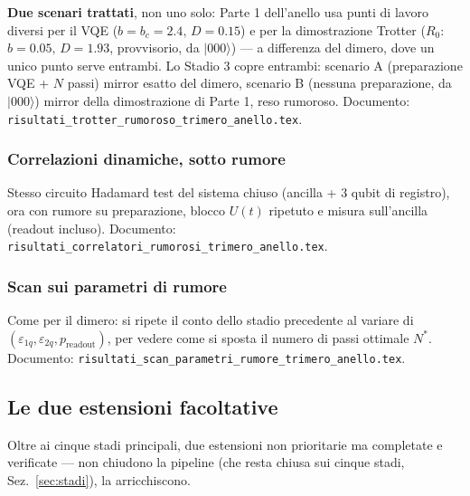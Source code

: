 \documentclass[11pt,a4paper]{article}
\newcommand{\ket}[1]{\lvert #1 \rangle}
\begin{document}
\textbf{Due scenari trattati}, non uno solo: Parte 1 dell'anello usa
punti di lavoro diversi per il VQE ($b=b_c=2.4,\,D=0.15$) e per la
dimostrazione Trotter ($R_0$: $b=0.05,\,D=1.93$, provvisorio, da
$\ket{000}$) --- a differenza del dimero, dove un unico punto serve
entrambi. Lo Stadio 3 copre entrambi: scenario A (preparazione VQE + $N$
passi) mirror esatto del dimero, scenario B (nessuna preparazione, da
$\ket{000}$) mirror della dimostrazione di Parte 1, reso rumoroso.
Documento:
\texttt{risultati\_\allowbreak trotter\_\allowbreak rumoroso\_trimero\_anello.tex}.

\subsubsection{Correlazioni dinamiche, sotto rumore}

Stesso circuito Hadamard test del sistema chiuso (ancilla + 3 qubit di
registro), ora con rumore su preparazione, blocco $U(t)$ ripetuto e
misura sull'ancilla (readout incluso). Documento:
\texttt{risultati\_correlatori\_\allowbreak rumorosi\_trimero\_anello.tex}.

\subsubsection{Scan sui parametri di rumore}

Come per il dimero: si ripete il conto dello stadio precedente al
variare di $(\varepsilon_{1q},\varepsilon_{2q},p_\text{readout})$, per
vedere come si sposta il numero di passi ottimale $N^*$. Documento:
\texttt{risultati\_scan\_\allowbreak parametri\_rumore\_trimero\_anello.tex}.

\subsection{Le due estensioni facoltative}
\label{sec:estensioni}

Oltre ai cinque stadi principali, due estensioni non prioritarie ma
completate e verificate --- non chiudono la pipeline (che resta chiusa
sui cinque stadi, Sez.~\ref{sec:stadi}), la arricchiscono.
\end{document}
